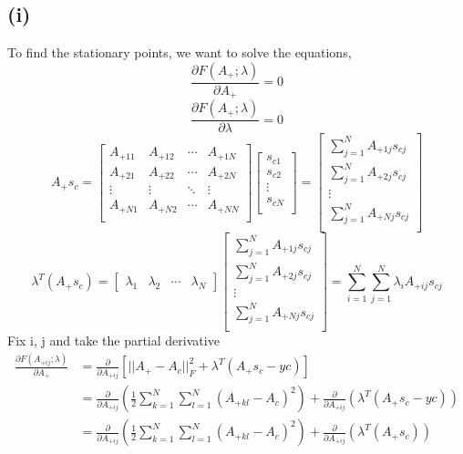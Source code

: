 \documentclass[11pt]{amsart}
\begin{document}
\subsection*{(i)}
To find the stationary points, we want to solve the equations,
\[
\frac{\partial F(A_{+};\lambda)}{\partial A_{+}} = 0
\]
\[
\frac{\partial F(A_{+};\lambda)}{\partial \lambda} = 0
\]
\[
A_{+}s_{c} =
\begin{bmatrix}
A_{+11} & A_{+12} & \cdots & A_{+1N}\\
A_{+21} & A_{+22} & \cdots &  A_{+2N}\\
\vdots & \vdots &  \ddots & \vdots\\
A_{+N1} & A_{+N2} & \cdots & A_{+NN}\\
\end{bmatrix}
\begin{bmatrix}
s_{c1}\\
s_{c2}\\
\vdots\\
s_{cN}\\
\end{bmatrix} =
\begin{bmatrix}
\sum_{j=1}^N A_{+1j}s_{cj}\\
\sum_{j=1}^N A_{+2j}s_{cj}\\
\vdots\\
\sum_{j=1}^N A_{+Nj}s_{cj}\\
\end{bmatrix}
\]
\newline
\[
\lambda^{T}(A_{+}s_{c}) = 
\begin{bmatrix}
\lambda_{1} & \lambda_{2} & \cdots & \lambda_{N}
\end{bmatrix}
\begin{bmatrix}
\sum_{j=1}^N A_{+1j}s_{cj}\\
\sum_{j=1}^N A_{+2j}s_{cj}\\
\vdots\\
\sum_{j=1}^N A_{+Nj}s_{cj}\\
\end{bmatrix} = \sum_{i=1}^N \sum_{j=1}^N \lambda_{i}A_{+ij}s_{cj}
\]
Fix i, j and take the partial derivative
\begin{align*}
\frac{\partial F(A_{+ij};\lambda)}{\partial A_{+}} &= \frac{\partial}{\partial A_{+ij}} [||A_{+}-A_{c}||_{F}^{2} + \lambda^{T}(A_{+}s_{c}-y{c})]\\
&=\frac{\partial}{\partial A_{+ij}}(\frac{1}{2}\sum_{k=1}^{N} \sum_{l=1}^N (A_{+kl}-A_{c})^{2})+\frac{\partial}{\partial A_{+ij}}(\lambda^{T}(A_{+}s_{c}-y{c}))\\
&= \frac{\partial}{\partial A_{+ij}}(\frac{1}{2}\sum_{k=1}^{N} \sum_{l=1}^N (A_{+kl}-A_{c})^{2})+\frac{\partial}{\partial A_{+ij}}(\lambda^{T}(A_{+}s_{c}))\\
\end{align*}
\end{document}
